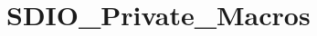 \hypertarget{group___s_d_i_o___private___macros}{}\section{S\+D\+I\+O\+\_\+\+Private\+\_\+\+Macros}
\label{group___s_d_i_o___private___macros}

